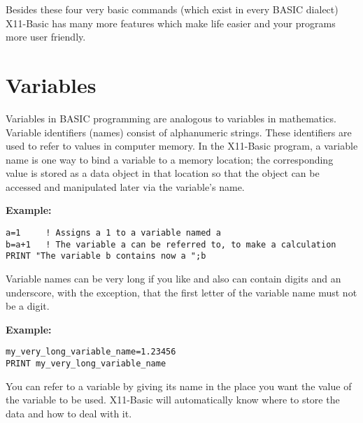 Besides these four very basic commands (which exist in every BASIC dialect)
X11-Basic has many more features which make life easier and your programs more
user friendly.

\section{Variables}

Variables in BASIC programming are analogous to variables in mathematics. 
Variable identifiers (names) consist of alphanumeric strings. These identifiers are 
used to refer to values in computer memory.
In the X11-Basic program, a variable name is one way to bind a variable to a 
memory location; the corresponding value is stored as a data object in that 
location so that the object can be accessed and manipulated later via the 
variable's name.

\begin{mdframed}[hidealllines=true,backgroundcolor=blue!20]
{\bf Example:}
\begin{verbatim}
a=1     ! Assigns a 1 to a variable named a
b=a+1   ! The variable a can be referred to, to make a calculation
PRINT "The variable b contains now a ";b
\end{verbatim}
\end{mdframed}

Variable names can be very long if you like and also can contain digits and an
underscore, with the exception, that the first letter of the variable name must
not be a digit.
\begin{mdframed}[hidealllines=true,backgroundcolor=blue!20]
{\bf Example:}
\begin{verbatim}
my_very_long_variable_name=1.23456
PRINT my_very_long_variable_name
\end{verbatim}
\end{mdframed}

You can refer to a variable by giving its name in the place you want the value
of the variable to be used. X11-Basic will automatically know where to store the
data and how to deal with it.

